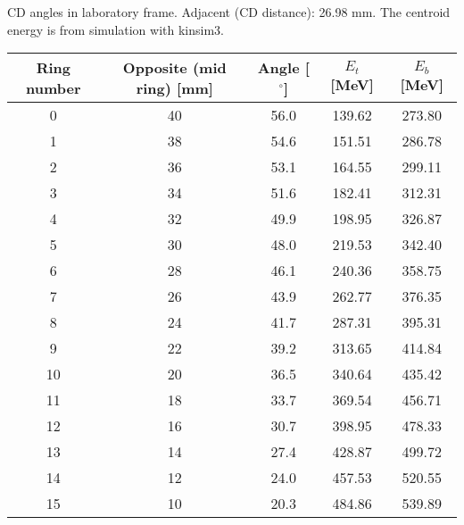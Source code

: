 \caption{CD angles in laboratory frame. Adjacent (CD distance): 26.98 mm. The centroid energy is from simulation with kinsim3.}
\label{tab:CD_angles}
\begin{tabular}{ccccc}
\hline
Ring number  &  Opposite (mid ring) [mm] &  Angle [$^\circ$]  &  $E_t$ [MeV]  &  $E_b$ [MeV]  \\
\hline
0            &  40                       &  56.0              &  139.62       &  273.80       \\
1            &  38                       &  54.6              &  151.51       &  286.78       \\
2            &  36                       &  53.1              &  164.55       &  299.11       \\
3            &  34                       &  51.6              &  182.41       &  312.31       \\
4            &  32                       &  49.9              &  198.95       &  326.87       \\
5            &  30                       &  48.0              &  219.53       &  342.40       \\
6            &  28                       &  46.1              &  240.36       &  358.75       \\
7            &  26                       &  43.9              &  262.77       &  376.35       \\
8            &  24                       &  41.7              &  287.31       &  395.31       \\
9            &  22                       &  39.2              &  313.65       &  414.84       \\
10           &  20                       &  36.5              &  340.64       &  435.42       \\
11           &  18                       &  33.7              &  369.54       &  456.71       \\
12           &  16                       &  30.7              &  398.95       &  478.33       \\
13           &  14                       &  27.4              &  428.87       &  499.72       \\
14           &  12                       &  24.0              &  457.53       &  520.55       \\
15           &  10                       &  20.3              &  484.86       &  539.89       \\
\hline
\end{tabular}